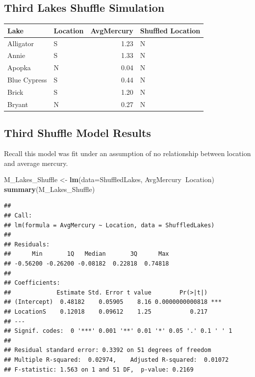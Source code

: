 \documentclass[]{book}
\newenvironment{Shaded}{\begin{snugshade}}{\end{snugshade}}
\newcommand{\KeywordTok}[1]{\textcolor[rgb]{0.13,0.29,0.53}{\textbf{#1}}}
\newcommand{\DataTypeTok}[1]{\textcolor[rgb]{0.13,0.29,0.53}{#1}}
\newcommand{\DecValTok}[1]{\textcolor[rgb]{0.00,0.00,0.81}{#1}}
\newcommand{\StringTok}[1]{\textcolor[rgb]{0.31,0.60,0.02}{#1}}
\newcommand{\OperatorTok}[1]{\textcolor[rgb]{0.81,0.36,0.00}{\textbf{#1}}}
\newcommand{\NormalTok}[1]{#1}
\begin{document}
\subsection{Third Lakes Shuffle
Simulation}\label{third-lakes-shuffle-simulation}

\begin{Shaded}
\end{Shaded}

\begin{tabular}{l|l|r|l}
\hline
Lake & Location & AvgMercury & Shuffled Location\\
\hline
Alligator & S & 1.23 & N\\
\hline
Annie & S & 1.33 & N\\
\hline
Apopka & N & 0.04 & N\\
\hline
Blue Cypress & S & 0.44 & N\\
\hline
Brick & S & 1.20 & N\\
\hline
Bryant & N & 0.27 & N\\
\hline
\end{tabular}

\subsection{Third Shuffle Model
Results}\label{third-shuffle-model-results}

Recall this model was fit under an assumption of no relationship between
location and average mercury.

\begin{Shaded}
\begin{Highlighting}[]
\NormalTok{M_Lakes_Shuffle <-}\StringTok{ }\KeywordTok{lm}\NormalTok{(}\DataTypeTok{data=}\NormalTok{ShuffledLakes, AvgMercury}\OperatorTok{~}\NormalTok{Location)}
\KeywordTok{summary}\NormalTok{(M_Lakes_Shuffle)}
\end{Highlighting}
\end{Shaded}

\begin{verbatim}
## 
## Call:
## lm(formula = AvgMercury ~ Location, data = ShuffledLakes)
## 
## Residuals:
##      Min       1Q   Median       3Q      Max 
## -0.56200 -0.26200 -0.08182  0.22818  0.74818 
## 
## Coefficients:
##             Estimate Std. Error t value        Pr(>|t|)    
## (Intercept)  0.48182    0.05905    8.16 0.0000000000818 ***
## LocationS    0.12018    0.09612    1.25           0.217    
## ---
## Signif. codes:  0 '***' 0.001 '**' 0.01 '*' 0.05 '.' 0.1 ' ' 1
## 
## Residual standard error: 0.3392 on 51 degrees of freedom
## Multiple R-squared:  0.02974,    Adjusted R-squared:  0.01072 
## F-statistic: 1.563 on 1 and 51 DF,  p-value: 0.2169
\end{verbatim}
\end{document}
